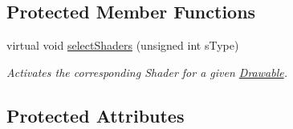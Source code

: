 \subsection*{Protected Member Functions}
\begin{DoxyCompactItemize}
\item 
virtual void \hyperlink{classtsgl_1_1_background_a5207bcb45daafed4d6a739a8a0a0829e}{select\+Shaders} (unsigned int s\+Type)
\begin{DoxyCompactList}\small\item\em Activates the corresponding Shader for a given \hyperlink{classtsgl_1_1_drawable}{Drawable}. \end{DoxyCompactList}\end{DoxyCompactItemize}
\subsection*{Protected Attributes}
